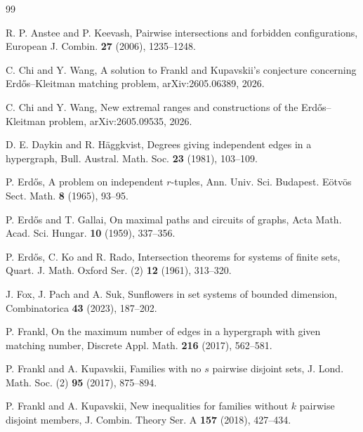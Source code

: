 \documentclass[10pt,a4paper]{article}
\numberwithin{equation}{section}
\theoremstyle{definition}
\begin{document}
\begin{thebibliography}{99}

        R. P. Anstee and P. Keevash,
        Pairwise intersections and forbidden configurations,
        European J. Combin. \textbf{27} (2006), 1235--1248.

        C. Chi and Y. Wang,
        A solution to Frankl and Kupavskii's conjecture concerning
        Erd\H{o}s--Kleitman matching problem,
        arXiv:2605.06389, 2026.

        C. Chi and Y. Wang,
        New extremal ranges and constructions of the Erd\H{o}s--Kleitman problem,
        arXiv:2605.09535, 2026.

        D. E. Daykin and R. H\"aggkvist,
        Degrees giving independent edges in a hypergraph,
        Bull. Austral. Math. Soc. \textbf{23} (1981), 103--109.

        P. Erd\H{o}s,
        A problem on independent $r$-tuples,
        Ann. Univ. Sci. Budapest. E\"otv\"os Sect. Math. \textbf{8} (1965), 93--95.

        P. Erd\H{o}s and T. Gallai,
        On maximal paths and circuits of graphs,
        Acta Math. Acad. Sci. Hungar. \textbf{10} (1959), 337--356.

        P. Erd\H{o}s, C. Ko and R. Rado,
        Intersection theorems for systems of finite sets,
        Quart. J. Math. Oxford Ser. (2) \textbf{12} (1961), 313--320.

        J. Fox, J. Pach and A. Suk,
        Sunflowers in set systems of bounded dimension,
        Combinatorica \textbf{43} (2023), 187--202.

        P. Frankl,
        On the maximum number of edges in a hypergraph with given matching number,
        Discrete Appl. Math. \textbf{216} (2017), 562--581.

        P. Frankl and A. Kupavskii,
        Families with no $s$ pairwise disjoint sets,
        J. Lond. Math. Soc. (2) \textbf{95} (2017), 875--894.

        P. Frankl and A. Kupavskii,
        New inequalities for families without $k$ pairwise disjoint members,
        J. Combin. Theory Ser. A \textbf{157} (2018), 427--434.


\end{thebibliography}
\end{document}
